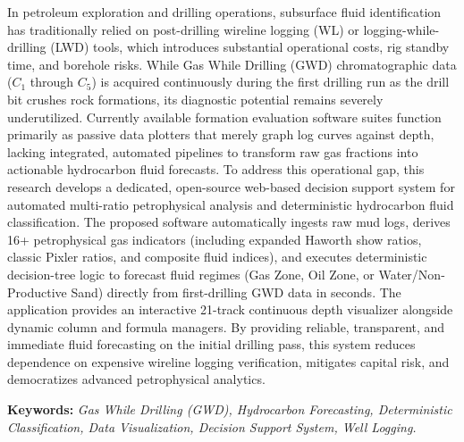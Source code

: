 \begin{abstracteng}
In petroleum exploration and drilling operations, subsurface fluid identification has traditionally relied on post-drilling wireline logging (WL) or logging-while-drilling (LWD) tools, which introduces substantial operational costs, rig standby time, and borehole risks. While Gas While Drilling (GWD) chromatographic data ($C_1$ through $C_5$) is acquired continuously during the first drilling run as the drill bit crushes rock formations, its diagnostic potential remains severely underutilized. Currently available formation evaluation software suites function primarily as passive data plotters that merely graph log curves against depth, lacking integrated, automated pipelines to transform raw gas fractions into actionable hydrocarbon fluid forecasts. To address this operational gap, this research develops a dedicated, open-source web-based decision support system for automated multi-ratio petrophysical analysis and deterministic hydrocarbon fluid classification. The proposed software automatically ingests raw mud logs, derives 16+ petrophysical gas indicators (including expanded Haworth show ratios, classic Pixler ratios, and composite fluid indices), and executes deterministic decision-tree logic to forecast fluid regimes (Gas Zone, Oil Zone, or Water/Non-Productive Sand) directly from first-drilling GWD data in seconds. The application provides an interactive 21-track continuous depth visualizer alongside dynamic column and formula managers. By providing reliable, transparent, and immediate fluid forecasting on the initial drilling pass, this system reduces dependence on expensive wireline logging verification, mitigates capital risk, and democratizes advanced petrophysical analytics.

\bigskip
\noindent\textbf{Keywords:} \textit{Gas While Drilling (GWD), Hydrocarbon Forecasting, Deterministic Classification, Data Visualization, Decision Support System, Well Logging.}
\end{abstracteng}

